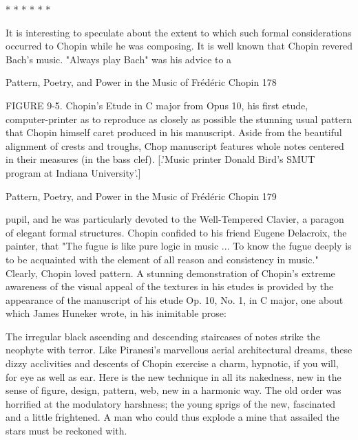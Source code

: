                          *   *          *    *               *       *

It is interesting to speculate about the extent to which such formal considerations
occurred to Chopin while he was composing. It is well known that Chopin revered Bach's
music. "Always play Bach" was his advice to a




Pattern, Poetry, and Power in the Music of Frédéric Chopin                                 178

FIGURE 9-5. Chopin's Etude in C major from Opus 10, his first etude, computer-printer
as to reproduce as closely as possible the stunning usual pattern that Chopin himself
caret produced in his manuscript. Aside from the beautiful alignment of crests and
troughs, Chop manuscript features whole notes centered in their measures (in the bass
clef). [.'Music printer Donald Bird's SMUT program at Indiana University'.]




Pattern, Poetry, and Power in the Music of Frédéric Chopin                       179

pupil, and he was particularly devoted to the Well-Tempered Clavier, a paragon of
elegant formal structures. Chopin confided to his friend Eugene Delacroix, the painter,
that "The fugue is like pure logic in music ... To know the fugue deeply is to be
acquainted with the element of all reason and consistency in music." Clearly, Chopin
loved pattern.
A stunning demonstration of Chopin's extreme awareness of the visual appeal of the
textures in his etudes is provided by the appearance of the manuscript of his etude Op. 10,
No. 1, in C major, one about which James Huneker wrote, in his inimitable prose:

   The irregular black ascending and descending staircases of notes strike the
   neophyte with terror. Like Piranesi's marvellous aerial architectural dreams, these
   dizzy acclivities and descents of Chopin exercise a charm, hypnotic, if you will,
   for eye as well as ear. Here is the new technique in all its nakedness, new in the
   sense of figure, design, pattern, web, new in a harmonic way. The old order was
   horrified at the modulatory harshness; the young sprigs of the new, fascinated and
   a little frightened. A man who could thus explode a mine that assailed the stars
   must be reckoned with.

